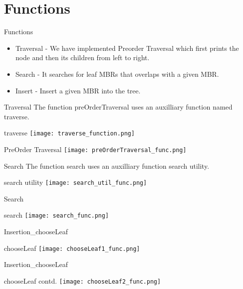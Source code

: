 \documentclass{beamer}
\begin{document}
\section{Functions}
\begin{frame}{Functions}
\begin{itemize}
    \item Traversal - We have implemented Preorder Traversal which first prints the node and then its children from left to right.
    \bigskip
    \item Search - It searches for leaf MBRs that overlaps with a given MBR.
    \bigskip
    \item Insert - Insert a given MBR into the tree.
    \bigskip
\end{itemize}
\end{frame}
\begin{frame}{Traversal}
    The function preOrderTraversal uses an auxilliary function named traverse.
    \begin{block}{traverse}
       \texttt{[image: traverse\_function.png]}
    \end{block}
        
    \begin{block}{PreOrder Traversal}
        \texttt{[image: preOrderTraversal\_func.png]}
    \end{block}
\end{frame}
\begin{frame}{Search}
    The function search uses an auxilliary function search utility.
    \begin{block}{search utility}
       \texttt{[image: search\_util\_func.png]}
    \end{block}
\end{frame}
\begin{frame}{Search}
\begin{block}{search}
       \texttt{[image: search\_func.png]}
    \end{block}
\end{frame}
\begin{frame}{Insertion_{chooseLeaf}}
    \begin{block}{chooseLeaf}
       \texttt{[image: chooseLeaf1\_func.png]}
    \end{block}
\end{frame}
\begin{frame}{Insertion_{chooseLeaf}}
    \begin{block}{chooseLeaf contd.}
       \texttt{[image: chooseLeaf2\_func.png]}
    \end{block}
\end{frame}
\end{document}
